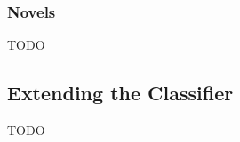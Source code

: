 \subsubsection{Novels}
\label{subsection:novelsBasic}
TODO

\subsection{Extending the Classifier}
\label{subsection:advancedResults}
TODO
